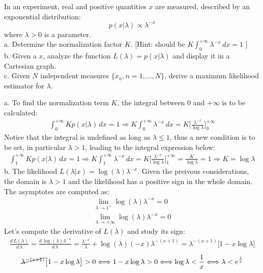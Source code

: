 \Exercise[number={10}]
In an experiment, real and positive quantities \(x\) are measured, described
by an exponential distribution:
\[
    p(x|\lambda) \propto \lambda^{-x}
\]
where \(\lambda>0\) is a parameter. \\
a. Determine the normalization factor \(K\). [Hint: should be
\(K\int_0^{+\infty}\lambda^{-x}\,dx = 1\)
] \\
b. Given a \(x\), analyze the function \(L(\lambda)=p(x|\lambda)\) and
display it in a Cartesian graph. \\
c. Given \(N\) independent measures \(\bigl\{ x_n, n=1,...,N \bigr\}\),
derive a maximum likelihood estimator for \(\lambda\).

\Answer[number={10}]
a. To find the normalization term \(K\), the integral between 0 and \(+\infty\) is to
be calculated:
\begin{align*}
    \int_{0}^{+\infty}Kp(x|\lambda)\,dx = 1
    \Rightarrow
    K\int_{0}^{+\infty}\lambda^{-x}\,dx
    =
    K\biggl[\frac{\lambda^{-x}}{\log{\lambda}}\biggr]_{0}^{+\infty}
\end{align*}
Notice that the integral is undefined as long as \(\lambda \le 1\), thus
a new condition is to be set, in particular \(\lambda > 1\), leading
to the integral expression below:
\begin{align*}
    \int_{1}^{+\infty}Kp(x|\lambda)\,dx = 1
    \Rightarrow
    K\int_{1}^{+\infty}\lambda^{-x}\,dx
    =
    K\biggl[\frac{\lambda^{-x}}{\log{\lambda}}\biggr]_{1}^{+\infty}
    =
    \frac{K}{\log{\lambda}}=1
    \Rightarrow
    K=\log{\lambda}
\end{align*}
b. The likelihood \(L(\lambda|x)=\log{(\lambda)}\lambda^{-x}\). Given the
preivous considerations, the domain is \(\lambda>1\) and the likelihood
has a positive sign in the whole domain. The asymptotes are computed as:
\begin{align*}
    \lim_{\lambda\to{1^+}}\log{(\lambda)}\lambda^{-x} = 0 \\
    \lim_{\lambda\to{+\infty}}\log{(\lambda)}\lambda^{-x} = 0
\end{align*}
Let's compute the derivative of \(L(\lambda)\) and study its sign:
\begin{align*}
    \frac{d\,L(\lambda)}{d\,\lambda}
    =
    \frac{d\,\log{(\lambda)}\lambda^{-x}}{d\,\lambda}
    =
    \frac{\lambda^{-x}}{\lambda}+\log{(\lambda)}(-x)\lambda^{-(x+1)}
    =
    \lambda^{-(x+1)}\bigl[1-x\log{\lambda}\bigr]
\end{align*}
\begin{align*}
    \cancel{\lambda^{-(x+1)}}\bigl[1-x\log{\lambda}\bigr] > 0
    \Longleftrightarrow
    1-x\log{\lambda} > 0
    \Longleftrightarrow
    \log{\lambda} < \frac{1}{x}
    \Longleftrightarrow
    \lambda < e^{\frac{1}{x}}
\end{align*}
